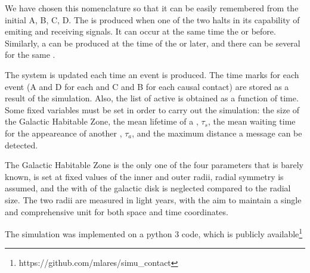 We have chosen this nomenclature so that it can be easily remembered
from the initial A, B, C, D.
%
The \blackout is produced when one of the two \cetis{} halts in its
capability of emiting and receiving signals.
%
It can occur at the same time the \doomsday or before.
%
Similarly, a \ccontact can be produced at the time of the \aawakening
or later, and there can be several \contacts for the same \ceti{}.

                        

The system is updated each time an event is produced.
%
The time marks for each event (A and D for each \ceti{} and C and B for
each causal contact) are stored as a result of the simulation.
%
Also, the list of active \cetis{} is obtained as a function of time.
%
Some fixed variables must be set in order to carry out the simulation:
the size of the Galactic Habitable Zone, the mean lifetime of a
\ceti{},
$\tau_s$, the mean waiting time for the appeareance of another \ceti{},
$\tau_a$, and the maximum distance a message can be detected.



The Galactic Habitable Zone is the only one of the four parameters
that is barely known, is set at fixed values of the inner and outer
radii, radial symmetry is assumed, and the with of the galactic disk is
neglected compared to the radial size.
%
The two radii are measured in light years, with the aim to maintain a
single and comprehensive unit for both space and time coordinates. 

The simulation was implemented on a python 3 code, which is publicly
available\footnote{https://github.com/mlares/simu\_contact}


